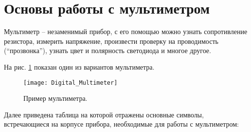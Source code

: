 \documentclass[../main.tex]{subfiles}
\begin{document}
\section{Основы работы с мультиметром}

Мультиметр -- незаменимый прибор, с его помощью можно узнать сопротивление
резистора, измерить напряжение, произвести проверку на проводимость
(``прозвонка''), узнать цвет и полярность светодиода и многое другое.

На рис. \ref{fig:multimeter-example} показан один из вариантов мультиметра.

\begin{figure}[ht]
  \centering
  \caption{Пример мультиметра.}
  \texttt{[image: Digital\_Multimeter]}
  \label{fig:multimeter-example}
\end{figure}

Далее приведена таблица на которой отражены основные символы, встречающиеся на
корпусе прибора, необходимые для работы с мультиметром:
\end{document}
